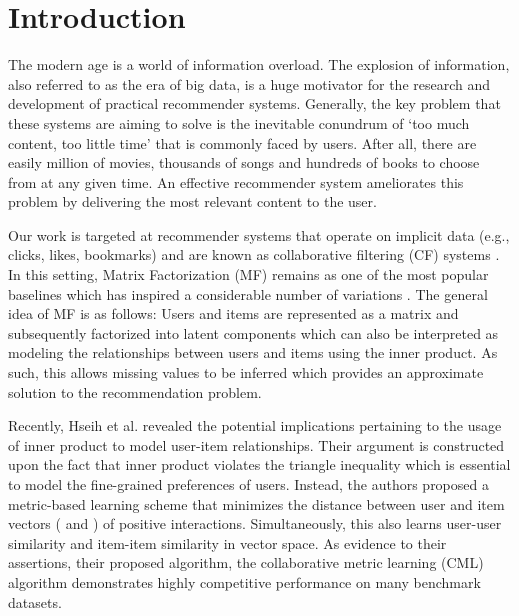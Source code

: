 \documentclass[sigconf]{acmart}
\begin{document}


\maketitle

\section{Introduction}

The modern age is a world of information overload. The explosion of information, also referred to as the era of big data, is a huge motivator for the research and development of practical recommender systems. Generally, the key problem that these systems are aiming to solve is the inevitable conundrum of `too much content, too little time' that is commonly faced by users. After all, there are easily million of movies, thousands of songs and hundreds of books to choose from at any given time. An effective recommender system ameliorates this problem by delivering the most relevant content to the user. 

Our work is targeted at recommender systems that operate on implicit data (e.g., clicks, likes, bookmarks) and are known as collaborative filtering (CF) systems \cite{DBLP:conf/www/SarwarKKR01}. In this setting, Matrix Factorization (MF) remains as one of the most popular baselines which has inspired a considerable number of variations \cite{DBLP:conf/sigir/HeZKC16,DBLP:conf/uai/RendleFGS09,He:2017:NCF:3038912.3052569,DBLP:conf/kdd/Koren08}. The general idea of MF is as follows: Users and items are represented as a matrix and subsequently factorized into latent components which can also be interpreted as modeling the relationships between users and items using the inner product. As such, this allows missing values to be inferred which provides an approximate solution to the recommendation problem.

Recently, Hseih et al. \cite{DBLP:conf/www/HsiehYCLBE17} revealed the potential implications pertaining to the usage of inner product to model user-item relationships. Their argument is constructed upon the fact that inner product violates the triangle inequality which is essential to model the fine-grained preferences of users. Instead, the authors proposed a metric-based learning scheme that minimizes the distance between user and item vectors ( and ) of positive interactions. Simultaneously, this also learns user-user similarity and item-item similarity in vector space. As evidence to their assertions, their proposed algorithm, the collaborative metric learning (CML) algorithm \cite{DBLP:conf/www/HsiehYCLBE17} demonstrates highly competitive performance on many benchmark datasets. 
\end{document}
